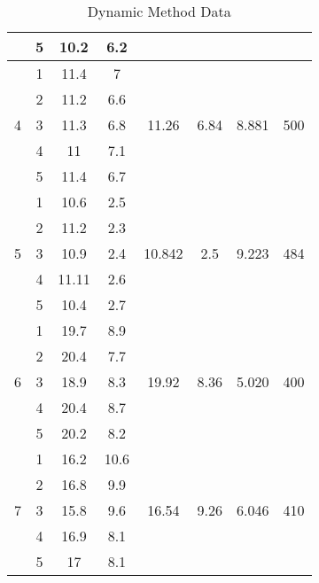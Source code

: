 \begin{table}[H]
{\begin{tabular}{|c|c|c|c|c|c|c|c|}
	 & 5 & 10.2 & 6.2 &  &  &  &  \\ \hline
	\multirow{5}{*}{4} & 1 & 11.4 & 7 & \multirow{5}{*}{11.26} & \multirow{5}{*}{6.84} & \multirow{5}{*}{8.881} & \multirow{5}{*}{500} \\ \cline{2-4}
	 & 2 & 11.2 & 6.6 &  &  &  &  \\ \cline{2-4}
	 & 3 & 11.3 & 6.8 &  &  &  &  \\ \cline{2-4}
	 & 4 & 11 & 7.1 &  &  &  &  \\ \cline{2-4}
	 & 5 & 11.4 & 6.7 &  &  &  &  \\ \hline
	\multirow{5}{*}{5} & 1 & 10.6 & 2.5 & \multirow{5}{*}{10.842} & \multirow{5}{*}{2.5} & \multirow{5}{*}{9.223} & \multirow{5}{*}{484} \\ \cline{2-4}
	 & 2 & 11.2 & 2.3 &  &  &  &  \\ \cline{2-4}
	 & 3 & 10.9 & 2.4 &  &  &  &  \\ \cline{2-4}
	 & 4 & 11.11 & 2.6 &  &  &  &  \\ \cline{2-4}
	 & 5 & 10.4 & 2.7 &  &  &  &  \\ \hline
	\multirow{5}{*}{6} & 1 & 19.7 & 8.9 & \multirow{5}{*}{19.92} & \multirow{5}{*}{8.36} & \multirow{5}{*}{5.020} & \multirow{5}{*}{400} \\ \cline{2-4}
	 & 2 & 20.4 & 7.7 &  &  &  &  \\ \cline{2-4}
	 & 3 & 18.9 & 8.3 &  &  &  &  \\ \cline{2-4}
	 & 4 & 20.4 & 8.7 &  &  &  &  \\ \cline{2-4}
	 & 5 & 20.2 & 8.2 &  &  &  &  \\ \hline
	\multirow{5}{*}{7} & 1 & 16.2 & 10.6 & \multirow{5}{*}{16.54} & \multirow{5}{*}{9.26} & \multirow{5}{*}{6.046} & \multirow{5}{*}{410} \\ \cline{2-4}
	 & 2 & 16.8 & 9.9 &  &  &  &  \\ \cline{2-4}
	 & 3 & 15.8 & 9.6 &  &  &  &  \\ \cline{2-4}
	 & 4 & 16.9 & 8.1 &  &  &  &  \\ \cline{2-4}
	 & 5 & 17 & 8.1 &  &  &  &  \\ \hline
	\end{tabular}%
	}
	\caption{Dynamic Method Data}
	\label{tab:1}
\end{table}